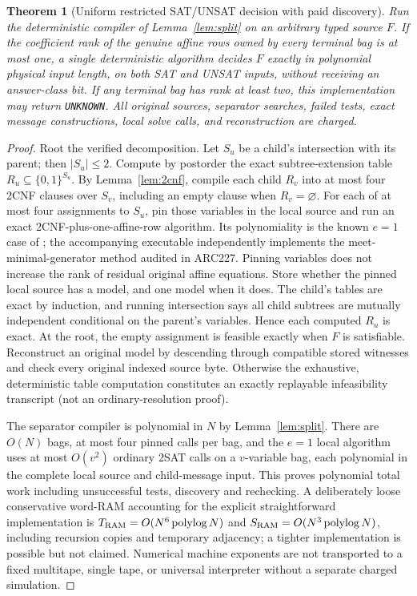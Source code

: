 \documentclass[10pt]{article}
\newtheorem{theorem}{Theorem}
\begin{document}
\begin{theorem}[Uniform restricted SAT/UNSAT decision with paid discovery]\label{th:main}
Run the deterministic compiler of Lemma~\ref{lem:split} on an arbitrary typed source $F$. If the coefficient rank of the genuine affine rows owned by \emph{every terminal bag} is at most one, a single deterministic algorithm decides $F$ exactly in polynomial physical input length, on both SAT and UNSAT inputs, without receiving an answer-class bit. If any terminal bag has rank at least two, this implementation may return \texttt{UNKNOWN}. All original sources, separator searches, failed tests, exact message constructions, local solve calls, and reconstruction are charged.
\end{theorem}
\begin{proof}
Root the verified decomposition. Let $S_u$ be a child's intersection with its parent; then $|S_u|\le2$. Compute by postorder the exact subtree-extension table $R_u\subseteq\{0,1\}^{S_u}$. By Lemma~\ref{lem:2cnf}, compile each child $R_v$ into at most four 2CNF clauses over $S_v$, including an empty clause when $R_v=\varnothing$. For each of at most four assignments to $S_u$, pin those variables in the local source and run an exact 2CNF-plus-one-affine-row algorithm. Its polynomiality is the known $e=1$ case of \cite{AG2021}; the accompanying executable independently implements the meet-minimal-generator method audited in ARC227. Pinning variables does not increase the rank of residual original affine equations. Store whether the pinned local source has a model, and one model when it does. The child's tables are exact by induction, and running intersection says all child subtrees are mutually independent conditional on the parent's variables. Hence each computed $R_u$ is exact. At the root, the empty assignment is feasible exactly when $F$ is satisfiable. Reconstruct an original model by descending through compatible stored witnesses and check every original indexed source byte. Otherwise the exhaustive, deterministic table computation constitutes an exactly replayable infeasibility transcript (not an ordinary-resolution proof).

The separator compiler is polynomial in $N$ by Lemma~\ref{lem:split}. There are $O(N)$ bags, at most four pinned calls per bag, and the $e=1$ local algorithm uses at most $O(v^2)$ ordinary 2SAT calls on a $v$-variable bag, each polynomial in the complete local source and child-message input. This proves polynomial total work including unsuccessful tests, discovery and rechecking. A deliberately loose conservative word-RAM accounting for the explicit straightforward implementation is $T_{\rm RAM}=O(N^6\operatorname{polylog}N)$ and $S_{\rm RAM}=O(N^3\operatorname{polylog}N)$, including recursion copies and temporary adjacency; a tighter implementation is possible but not claimed. Numerical machine exponents are not transported to a fixed multitape, single tape, or universal interpreter without a separate charged simulation.
\end{proof}
\end{document}
